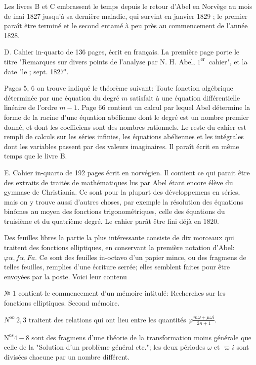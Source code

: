 \documentclass{article}
\begin{document}
Les livres B et C embrassent le temps depuis le retour d'Abel en Norvège au mois de inai 1827 jusqu'à sa dernière maladie, qui survint en janvier 1829 ; le premier paraît être terminé et le second entamé à peu près au commencement de l'année 1828.

D. Cahier in-quarto de 136 pages, écrit en français. La première page porte le titre "Remarques sur divers points de l'analyse par N. H. Abel, \(1^{\text {er }}\) cahier", et la date "le ; sept. 1827".

Pages 5, 6 on trouve indiqué le théorème suivant: Toute fonction algébrique déterminée par une équation du degré \(m\) satisfait à une équation différentielle linéaire de l'ordre \(m-1\). Page 66 contient un calcul par lequel Abel détermine la forme de la racine d'une équation abélienne dont le degré est un nombre premier donné, et dont les coefficiens sont des nombres rationnels. Le reste du cahier est rempli de calculs sur les
séries infinies, les équations abéliennes et les intégrales dont les variables passent par des valeurs imaginaires. Il paraît écrit en même temps que le livre B.

E. Cahier in-quarto de 192 pages écrit en norvégien. Il contient ce qui parait être des extraits de traités de mathématiques lus par Abel étant encore élève du gymnase de Christiania. Ce sont pour la plupart des développemens en séries, mais on y trouve aussi d'autres choses, par exemple la résolution des équations binômes au moyen des fonctions trigonométriques, celle des équations du truisième et du quatrième degré. Le cahier parât être fini déjà en 1820.

Des feuilles libres la partie la plus intéressante consiste de dix morceaux qui traitent des fonctions elliptiques, en conservant la première notation d'Abel: \(\varphi \alpha, f \alpha, F a\). Ce sont des feuilles in-octavo d'un papier mince, ou des fragmens de telles feuilles, remplies d'une écriture serrée; elles semblent faites pour être envoyées par la poste. Voici leur contenu

№ 1 contient le commencement d'un mémoire intitulé: Recherches sur les fonctions elliptiques. Second mémoire.

\(N^{\text {oo }} 2,3\) traitent des relations qui ont lieu entre les quantités \(\varphi \frac{m \omega+\mu \omega i}{2 n+1}\).

\(\mathrm{N}^{\mathrm{os}} 4-8\) sont des fragmens d'une théorie de la transformation moins générale que celle de la "Solution d'un problème général etc."; les deux périodes \(\omega\) et \(\varpi i\) sont divisées chacune par un nombre différent.
\end{document}
